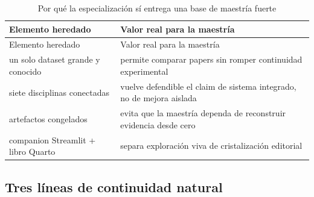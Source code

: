 \documentclass[
  spanish,
  11pt,
  letterpaper,
]{scrbook}
\theoremstyle{plain}
\theoremstyle{remark}
\begin{document}
\begin{longtable}[]{@{}
  >{\raggedright\arraybackslash}p{}
  >{\raggedright\arraybackslash}p{}@{}}
\caption{Por qué la especialización sí entrega una base de maestría
fuerte}\label{tbl-bridge-value}\tabularnewline
\toprule\noalign{}
\begin{minipage}[b]{\linewidth}\raggedright
Elemento heredado
\end{minipage} & \begin{minipage}[b]{\linewidth}\raggedright
Valor real para la maestría
\end{minipage} \\
\midrule\noalign{}
\endfirsthead
\toprule\noalign{}
\begin{minipage}[b]{\linewidth}\raggedright
Elemento heredado
\end{minipage} & \begin{minipage}[b]{\linewidth}\raggedright
Valor real para la maestría
\end{minipage} \\
\midrule\noalign{}
\endhead
\bottomrule\noalign{}
\endlastfoot
un solo dataset grande y conocido & permite comparar papers sin romper
continuidad experimental \\
siete disciplinas conectadas & vuelve defendible el claim de sistema
integrado, no de mejora aislada \\
artefactos congelados & evita que la maestría dependa de reconstruir
evidencia desde cero \\
companion Streamlit + libro Quarto & separa exploración viva de
cristalización editorial \\
\end{longtable}

\subsection{Tres líneas de continuidad
natural}\label{tres-luxedneas-de-continuidad-natural}
\end{document}
